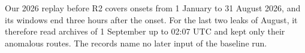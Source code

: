 Our 2026 replay before R2 covers onsets from 1 January to 31 August 2026, and its windows end three hours after the onset.
For the last two leaks of August, it therefore read archives of 1 September up to 02:07 UTC and kept only their anomalous routes.
The records name no later input of the baseline run.

